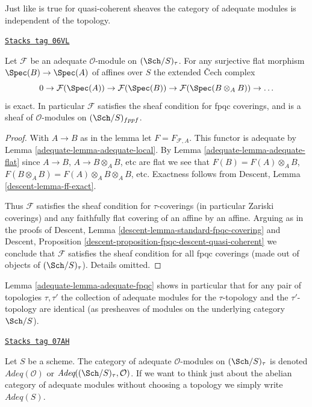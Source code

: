 Just like is true for quasi-coherent sheaves the category of
adequate modules is independent of the topology.

\begin{lemma}
\label{adequate-lemma-adequate-fpqc}
\href{https://stacks.math.columbia.edu/tag/06VL}{\texttt{Stacks tag 06VL}}

Let $\mathcal{F}$ be an adequate $\mathcal{O}$-module on
$(\Sch/S)_\tau$. For any surjective flat morphism
$\Spec(B) \to \Spec(A)$ of affines over $S$
the extended {\v C}ech complex
$$
0 \to \mathcal{F}(\Spec(A)) \to
\mathcal{F}(\Spec(B)) \to
\mathcal{F}(\Spec(B \otimes_A B)) \to \ldots
$$
is exact. In particular $\mathcal{F}$ satisfies the sheaf condition
for fpqc coverings, and is a sheaf of $\mathcal{O}$-modules
on $(\Sch/S)_{fppf}$.
\end{lemma}

\begin{proof}

With $A \to B$ as in the lemma let $F = F_{\mathcal{F}, A}$. This functor
is adequate by
Lemma \ref{adequate-lemma-adequate-local}.
By
Lemma \ref{adequate-lemma-adequate-flat}
since $A \to B$, $A \to B \otimes_A B$, etc are flat we see that
$F(B) = F(A) \otimes_A B$,
$F(B \otimes_A B) = F(A) \otimes_A B \otimes_A B$, etc.
Exactness follows from
Descent, Lemma \ref{descent-lemma-ff-exact}.

\medskip\noindent
Thus $\mathcal{F}$ satisfies the sheaf condition for
$\tau$-coverings (in particular Zariski coverings) and any faithfully
flat covering of an affine by an affine. Arguing as in the proofs of
Descent, Lemma \ref{descent-lemma-standard-fpqc-covering}
and
Descent, Proposition \ref{descent-proposition-fpqc-descent-quasi-coherent}
we conclude that $\mathcal{F}$ satisfies the sheaf condition for all
fpqc coverings (made out of objects of $(\Sch/S)_\tau$).
Details omitted.
\end{proof}

Lemma \ref{adequate-lemma-adequate-fpqc} shows in particular that
for any pair of topologies $\tau, \tau'$ the collection
of adequate modules for the $\tau$-topology and the $\tau'$-topology
are identical (as presheaves of modules on the underlying category $\Sch/S$).

\begin{definition}
\label{adequate-definition-category-adequate-modules}
\href{https://stacks.math.columbia.edu/tag/07AH}{\texttt{Stacks tag 07AH}}

Let $S$ be a scheme. The category of adequate $\mathcal{O}$-modules on
$(\Sch/S)_\tau$ is denoted {\it $\textit{Adeq}(\mathcal{O})$} or
{\it $\textit{Adeq}((\Sch/S)_\tau, \mathcal{O})$}. If we want to think just
about the abelian category of adequate modules without choosing a
topology we simply write {\it $\textit{Adeq}(S)$}.
\end{definition}

